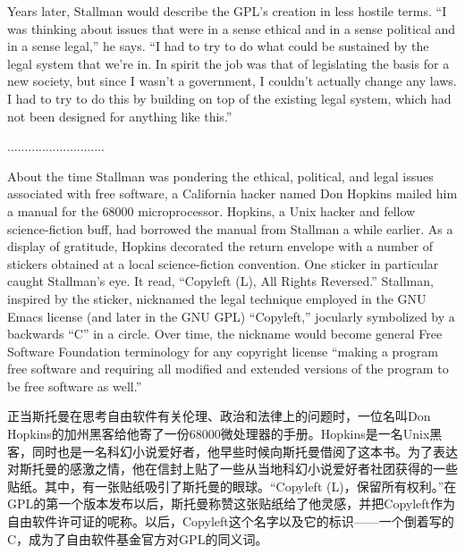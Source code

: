 {\ifdefined{}} Years later, Stallman would describe the GPL's creation in less hostile terms. ``I was thinking about issues that were in a sense ethical and in a sense political and in a sense legal,'' he says. ``I had to try to do what could be sustained by the legal system that we're in. In spirit the job was that of legislating the basis for a new society, but since I wasn't a government, I couldn't actually change any laws. I had to try to do this by building on top of the existing legal system, which had not been designed for anything like this.''
\fi

\ifdefined\chs
............................
\fi

\ifdefined\eng
About the time Stallman was pondering the ethical, political, and legal issues associated with free software, a California hacker named Don Hopkins mailed him a manual for the 68000 microprocessor. Hopkins, a Unix hacker and fellow science-fiction buff, had borrowed the manual from Stallman a while earlier. As a display of gratitude, Hopkins decorated the return envelope with a number of stickers obtained at a local science-fiction convention. One sticker in particular caught Stallman's eye. It read, ``Copyleft (L), All Rights Reversed.''  Stallman, inspired by the sticker, nicknamed the legal technique employed in the GNU Emacs license (and later in the GNU GPL) ``Copyleft,'' jocularly symbolized by a backwards ``C'' in a circle. Over time, the nickname would become general Free Software Foundation terminology for any copyright license ``making a program free software and requiring all modified and extended versions of the program to be free software as well.''
\fi

\ifdefined\chs
正当斯托曼在思考自由软件有关伦理、政治和法律上的问题时，一位名叫Don Hopkins的加州黑客给他寄了一份68000微处理器的手册。Hopkins是一名Unix黑客，同时也是一名科幻小说爱好者，他早些时候向斯托曼借阅了这本书。为了表达对斯托曼的感激之情，他在信封上贴了一些从当地科幻小说爱好者社团获得的一些贴纸。其中，有一张贴纸吸引了斯托曼的眼球。“Copyleft (L)，保留所有权利。”在GPL的第一个版本发布以后，斯托曼称赞这张贴纸给了他灵感，并把Copyleft作为自由软件许可证的呢称。以后，Copyleft这个名字以及它的标识——一个倒着写的C，成为了自由软件基金官方对GPL的同义词。
\fi

